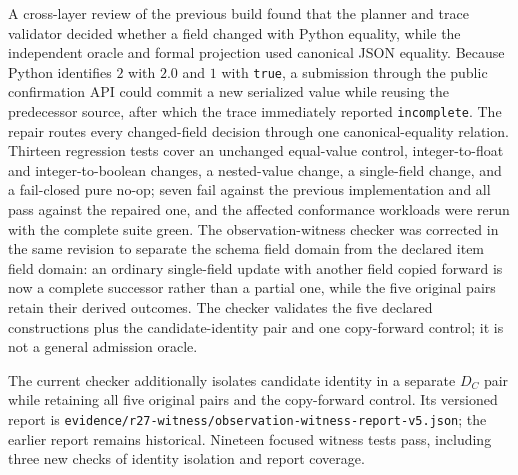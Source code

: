 \documentclass[preprint,12pt,authoryear]{elsarticle}
\newcommand{\code}[1]{\nolinkurl{#1}}
\begin{document}
A cross-layer review of the previous build found that the planner and trace validator decided whether a field changed with Python equality, while the independent oracle and formal projection used canonical JSON equality. Because Python identifies $2$ with $2.0$ and $1$ with \code{true}, a submission through the public confirmation API could commit a new serialized value while reusing the predecessor source, after which the trace immediately reported \code{incomplete}. The repair routes every changed-field decision through one canonical-equality relation. Thirteen regression tests cover an unchanged equal-value control, integer-to-float and integer-to-boolean changes, a nested-value change, a single-field change, and a fail-closed pure no-op; seven fail against the previous implementation and all pass against the repaired one, and the affected conformance workloads were rerun with the complete suite green. The observation-witness checker was corrected in the same revision to separate the schema field domain from the declared item field domain: an ordinary single-field update with another field copied forward is now a complete successor rather than a partial one, while the five original pairs retain their derived outcomes. The checker validates the five declared constructions plus the candidate-identity pair and one copy-forward control; it is not a general admission oracle.


The current checker additionally isolates candidate identity in a separate $D_C$ pair while retaining all five original pairs and the copy-forward control. Its versioned report is \code{evidence/r27-witness/observation-witness-report-v5.json}; the earlier report remains historical. Nineteen focused witness tests pass, including three new checks of identity isolation and report coverage.
\end{document}
